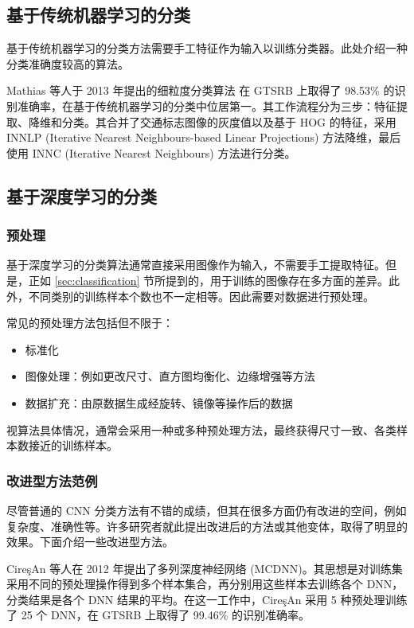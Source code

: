 \documentclass{report}
\begin{document}
\subsection{基于传统机器学习的分类}

基于传统机器学习的分类方法需要手工特征作为输入以训练分类器。此处介绍一种分类准确度较高的算法。

Mathias 等人于 2013 年提出的细粒度分类算法 \cite{Mathias} 在 GTSRB \cite{GTSRB} 上取得了 98.53\% 的识别准确率，在基于传统机器学习的分类中位居第一。其工作流程分为三步：特征提取、降维和分类。其合并了交通标志图像的灰度值以及基于 HOG 的特征，采用 INNLP (Iterative Nearest Neighbours-based Linear Projections) 方法降维，最后使用 INNC (Iterative Nearest Neighbours) 方法进行分类。

\subsection{基于深度学习的分类}

\subsubsection{预处理}

基于深度学习的分类算法通常直接采用图像作为输入，不需要手工提取特征。但是，正如 \ref{sec:classification} 节所提到的，用于训练的图像存在多方面的差异。此外，不同类别的训练样本个数也不一定相等。因此需要对数据进行预处理。

常见的预处理方法包括但不限于：

\begin{itemize}
  \item 标准化
  \item 图像处理：例如更改尺寸、直方图均衡化、边缘增强等方法
  \item 数据扩充：由原数据生成经旋转、镜像等操作后的数据
\end{itemize}

视算法具体情况，通常会采用一种或多种预处理方法，最终获得尺寸一致、各类样本数接近的训练样本。

\subsubsection{改进型方法范例}

尽管普通的 CNN 分类方法有不错的成绩，但其在很多方面仍有改进的空间，例如复杂度、准确性等。许多研究者就此提出改进后的方法或其他变体，取得了明显的效果。下面介绍一些改进型方法。

CireşAn \cite{MCDNN} 等人在 2012 年提出了多列深度神经网络 (MCDNN)。其思想是对训练集采用不同的预处理操作得到多个样本集合，再分别用这些样本去训练各个 DNN，分类结果是各个 DNN 结果的平均。在这一工作中，CireşAn 采用 5 种预处理训练了 25 个 DNN，在 GTSRB 上取得了 99.46\% 的识别准确率。
\end{document}
